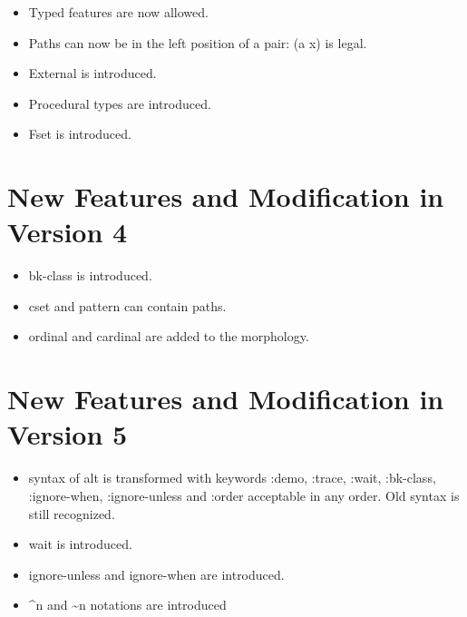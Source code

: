 \documentclass[10pt,a4paper]{report}
\begin{document}
\begin{appendices}
\begin{itemize}
\item Typed features are now allowed.

\item Paths can now be in the left position of a pair: ({a} x) is legal.

\item External is introduced.

\item Procedural types are introduced.

\item Fset is introduced.
\end{itemize}


\section{New Features and Modification in Version 4}

\begin{itemize}
\item bk-class is introduced.

\item cset and pattern can contain paths.

\item ordinal and cardinal are added to the morphology.
\end{itemize}


\section{New Features and Modification in Version 5}

\begin{itemize}
\item syntax of alt is transformed with keywords :demo, :trace, :wait, :bk-class,
:ignore-when, :ignore-unless and :order acceptable in any order.  Old
syntax is still recognized.

\item wait is introduced.

\item ignore-unless and ignore-when are introduced.


\item \^{}n and \~{}n notations are introduced


\end{itemize}
\end{appendices}
\end{document}
